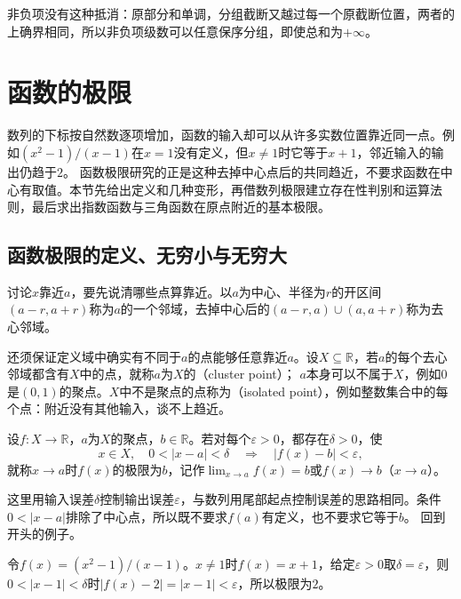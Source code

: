 非负项没有这种抵消：原部分和单调，分组截断又越过每一个原截断位置，两者的上确界相同，所以非负项级数可以任意保序分组，即使总和为$+\infty$。
\section{函数的极限}
\label{sec:ru-function-limits}
\label{sec:analysis-function-limits}

数列的下标按自然数逐项增加，函数的输入却可以从许多实数位置靠近同一点。例如$(x^2-1)/(x-1)$在$x=1$没有定义，但$x\neq1$时它等于$x+1$，邻近输入的输出仍趋于$2$。
函数极限研究的正是这种去掉中心点后的共同趋近，不要求函数在中心有取值。本节先给出定义和几种变形，再借数列极限建立存在性判别和运算法则，最后求出指数函数与三角函数在原点附近的基本极限。

\subsection{函数极限的定义、无穷小与无穷大}
\label{sec:ru-function-limit-definition}

讨论$x$靠近$a$，要先说清哪些点算靠近。以$a$为中心、半径为$r$的开区间$(a-r,a+r)$称为$a$的一个邻域，去掉中心后的$(a-r,a)\cup(a,a+r)$称为去心邻域。

还须保证定义域中确实有不同于$a$的点能够任意靠近$a$。设$X\subseteq\mathbb R$，若$a$的每个去心邻域都含有$X$中的点，就称$a$为$X$的（cluster point）；
$a$本身可以不属于$X$，例如$0$是$(0,1)$的聚点。$X$中不是聚点的点称为（isolated point），例如整数集合中的每个点：附近没有其他输入，谈不上趋近。

\begin{definition}[函数的极限]
\label{def:ru-function-limit}
设$f:X\to\mathbb R$，$a$为$X$的聚点，$b\in\mathbb R$。若对每个$\varepsilon>0$，都存在$\delta>0$，使
\[
 x\in X,\quad0<|x-a|<\delta\quad\Longrightarrow\quad|f(x)-b|<\varepsilon,
\]
就称$x\to a$时$f(x)$的极限为$b$，记作$\lim_{x\to a}f(x)=b$或$f(x)\to b$（$x\to a$）。
\end{definition}
这里用输入误差$\delta$控制输出误差$\varepsilon$，与数列用尾部起点控制误差的思路相同。条件$0<|x-a|$排除了中心点，所以既不要求$f(a)$有定义，也不要求它等于$b$。
回到开头的例子。
\begin{example}[在中心无定义的函数的极限]
\label{ex:ru-removable-singularity-limit}
令$f(x)=(x^2-1)/(x-1)$。$x\neq1$时$f(x)=x+1$，给定$\varepsilon>0$取$\delta=\varepsilon$，则$0<|x-1|<\delta$时$|f(x)-2|=|x-1|<\varepsilon$，所以极限为$2$。
\end{example}

